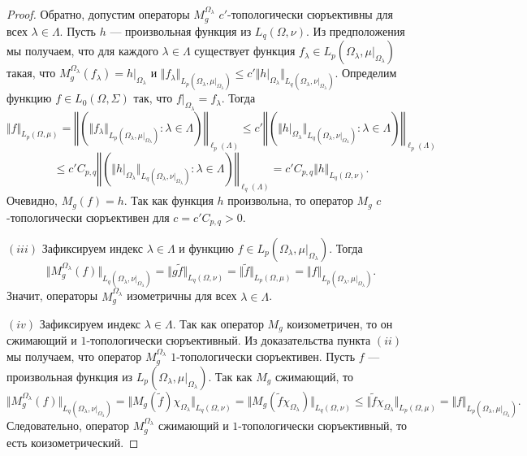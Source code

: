 \begin{proof}
Обратно, допустим операторы $M_g^{\Omega_\lambda}$ $c'$-топологически
сюръективны для всех $\lambda\in\Lambda$. Пусть $h$ --- произвольная функция из
$L_q(\Omega,\nu)$. Из предположения мы получаем, что для каждого
$\lambda\in\Lambda$ существует функция $f_\lambda\in
L_p(\Omega_\lambda,\mu|_{\Omega_\lambda})$ такая, что
$M_g^{\Omega_\lambda}(f_\lambda)=h|_{\Omega_\lambda}$ и 
$\Vert f_\lambda\Vert_{L_p(\Omega_\lambda,\mu|_{\Omega_\lambda})}
\leq c'\Vert h|_{\Omega_\lambda}\Vert_{
    L_q(\Omega_\lambda,\nu|_{\Omega_\lambda})
}$. Определим функцию $f\in L_0(\Omega,\Sigma)$ так, 
что $f|_{\Omega_\lambda}=f_\lambda$. Тогда
$$
\Vert f\Vert_{L_p(\Omega,\mu)}
=\left\Vert\left(
    \Vert f_\lambda\Vert_{L_p(\Omega_\lambda,\mu|_{\Omega_\lambda})}
    :\lambda\in\Lambda
\right)\right\Vert_{\ell_p(\Lambda)}
\leq c'\left\Vert\left(
    \Vert h|_{\Omega_\lambda}\Vert_{L_q(\Omega_\lambda,\nu|_{\Omega_\lambda})}
    :\lambda\in\Lambda
\right)\right\Vert_{\ell_p(\Lambda)}
$$
$$
\leq c'C_{p,q}\left\Vert\left(
    \Vert h|_{\Omega_\lambda}\Vert_{L_q(\Omega_\lambda,\nu|_{\Omega_\lambda})}
    :\lambda\in\Lambda
    \right)\right\Vert_{\ell_q(\Lambda)}
=c'C_{p,q}\Vert h\Vert_{L_q(\Omega,\nu)}.
$$
Очевидно, $M_g(f)=h$. Так как функция $h$ произвольна, то оператор $M_g$
$c$-топологически сюръективен для $c=c'C_{p,q}>0$.

$(iii)$ Зафиксируем индекс $\lambda\in\Lambda$ и функцию $f\in
L_p(\Omega_\lambda,\mu|_{\Omega_\lambda})$. Тогда 
$$
\Vert M_g^{\Omega_\lambda}(f)\Vert_{L_q(\Omega_\lambda,\nu|_{\Omega_\lambda})}
=\Vert g \widetilde{f}\Vert_{L_q(\Omega,\nu)}
=\Vert\widetilde{f}\Vert_{L_p(\Omega,\mu)}
=\Vert f\Vert_{L_p(\Omega_\lambda,\mu|_{\Omega_\lambda})}.
$$
Значит, операторы $M_g^{\Omega_\lambda}$ изометричны для всех
$\lambda\in\Lambda$.

$(iv)$ Зафиксируем индекс $\lambda\in\Lambda$. Так как оператор $M_g$
коизометричен, то он сжимающий и $1$-топологически сюръективный. Из
доказательства пункта $(ii)$ мы получаем, что оператор $M_g^{\Omega_\lambda}$
$1$-топологически сюръективен. Пусть $f$ --- произвольная функция из $
L_p(\Omega_\lambda,\mu|_{\Omega_\lambda})$. Так как $M_g$ сжимающий, то
$$
\Vert M_g^{\Omega_\lambda}(f)\Vert_{L_q(\Omega_\lambda,\nu|_{\Omega_\lambda})}
=\Vert M_g(\widetilde{f})\chi_{\Omega_\lambda}\Vert_{L_q(\Omega,\nu)}
=\Vert M_g(\widetilde{f}\chi_{\Omega_\lambda})\Vert_{L_q(\Omega,\nu)}
\leq \Vert\widetilde{f}\chi_{\Omega_\lambda}\Vert_{L_p(\Omega,\mu)}
=\Vert f\Vert_{L_p(\Omega_{\lambda},\mu|_{\Omega_\lambda})}.
$$
Следовательно, оператор $M_g^{\Omega_\lambda}$ сжимающий и $1$-топологически
сюръективный, то есть коизометрический.
\end{proof}

